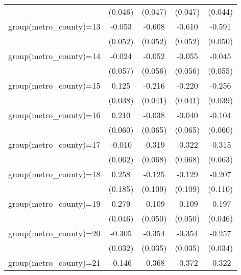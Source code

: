 {\begin{tabular}{l*{4}{c}}
                    &     (0.046)         &     (0.047)         &     (0.047)         &     (0.044)         \\
group(metro\_county)=13&      -0.053         &      -0.608\sym{***}&      -0.610\sym{***}&      -0.591\sym{***}\\
                    &     (0.052)         &     (0.052)         &     (0.052)         &     (0.050)         \\
group(metro\_county)=14&      -0.024         &      -0.052         &      -0.055         &      -0.045         \\
                    &     (0.057)         &     (0.056)         &     (0.056)         &     (0.055)         \\
group(metro\_county)=15&       0.125\sym{***}&      -0.216\sym{***}&      -0.220\sym{***}&      -0.256\sym{***}\\
                    &     (0.038)         &     (0.041)         &     (0.041)         &     (0.039)         \\
group(metro\_county)=16&       0.210\sym{***}&      -0.038         &      -0.040         &      -0.104\sym{*}  \\
                    &     (0.060)         &     (0.065)         &     (0.065)         &     (0.060)         \\
group(metro\_county)=17&      -0.010         &      -0.319\sym{***}&      -0.322\sym{***}&      -0.315\sym{***}\\
                    &     (0.062)         &     (0.068)         &     (0.068)         &     (0.063)         \\
group(metro\_county)=18&       0.258         &      -0.125         &      -0.129         &      -0.207\sym{*}  \\
                    &     (0.185)         &     (0.109)         &     (0.109)         &     (0.110)         \\
group(metro\_county)=19&       0.279\sym{***}&      -0.109\sym{**} &      -0.109\sym{**} &      -0.197\sym{***}\\
                    &     (0.046)         &     (0.050)         &     (0.050)         &     (0.046)         \\
group(metro\_county)=20&      -0.305\sym{***}&      -0.354\sym{***}&      -0.354\sym{***}&      -0.257\sym{***}\\
                    &     (0.032)         &     (0.035)         &     (0.035)         &     (0.034)         \\
group(metro\_county)=21&      -0.146\sym{***}&      -0.368\sym{***}&      -0.372\sym{***}&      -0.322\sym{***}\\

\end{tabular}}

